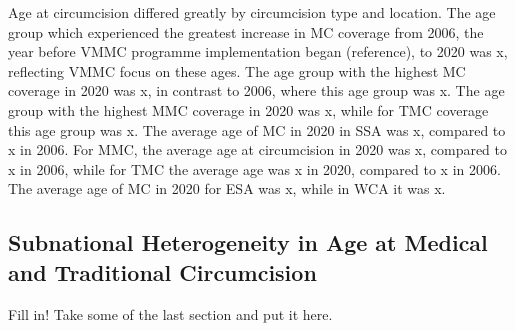 \documentclass{article}
\begin{document}
Age at circumcision differed greatly by circumcision type and location. 
The age group which experienced the greatest increase in MC coverage from 2006, the year before VMMC programme implementation began (reference), to 2020 was x, reflecting VMMC focus on these ages. 
The age group with the highest MC coverage in 2020 was x, in contrast to 2006, where this age group was x. 
The age group with the highest MMC coverage in 2020 was x, while for TMC coverage this age group was x. 
The average age of MC in 2020 in SSA was x, compared to x in 2006. 
For MMC, the average age at circumcision in 2020 was x, compared to x in 2006, while for TMC the average age was x in 2020, compared to x in 2006. 
The average age of MC in 2020 for ESA was x, while in WCA it was x. 

\subsection{Subnational Heterogeneity in Age at Medical and Traditional Circumcision}
\label{sec:org92e0f37}

Fill in! Take some of the last section and put it here. 
\end{document}
